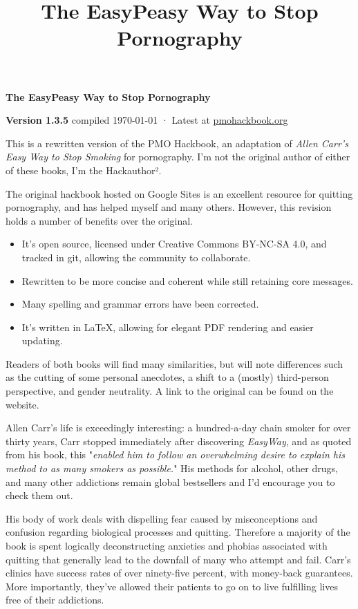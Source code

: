 \documentclass[easypeasy.tex]{subfiles}
\title {The EasyPeasy Way to Stop Pornography}
\begin{document}
\thispagestyle{empty}

\begin{center}
  {\Huge\bfseries The EasyPeasy Way to Stop Pornography \par}
  {\small \textbf{Version 1.3.5} compiled {\today} · Latest at \href{https://pmohackbook.org}{pmohackbook.org}}
\end{center}

This is a rewritten version of the PMO Hackbook, an adaptation of \textit{Allen Carr's Easy Way to Stop Smoking} for pornography. I'm not the original author of either of these books, I'm the Hackauthor².

The original hackbook hosted on Google Sites is an excellent resource for quitting pornography, and has helped myself and many others. However, this revision holds a number of benefits over the original.
\begin{itemize}
\item It's open source, licensed under Creative Commons BY-NC-SA 4.0, and tracked in git, allowing the community to collaborate.
\item Rewritten to be more concise and coherent while still retaining core messages.
\item Many spelling and grammar errors have been corrected.
\item It's written in LaTeX, allowing for elegant PDF rendering and easier updating.
\end{itemize}

Readers of both books will find many similarities, but will note differences such as the cutting of some personal anecdotes, a shift to a (mostly) third-person perspective, and gender neutrality. A link to the original can be found on the website.

Allen Carr's life is exceedingly interesting: a hundred-a-day chain smoker for over thirty years, Carr stopped immediately after discovering \textit{EasyWay}, and as quoted from his book, this "\textit{enabled him to follow an overwhelming desire to explain his method to as many smokers as possible.}" His methods for alcohol, other drugs, and many other addictions remain global bestsellers and I'd encourage you to check them out.

His body of work deals with dispelling fear caused by misconceptions and confusion regarding biological processes and quitting. Therefore a majority of the book is spent logically deconstructing anxieties and phobias associated with quitting that generally lead to the downfall of many who attempt and fail. Carr's clinics have success rates of over ninety-five percent, with money-back guarantees. More importantly, they've allowed their patients to go on to live fulfilling lives free of their addictions.
\end{document}
